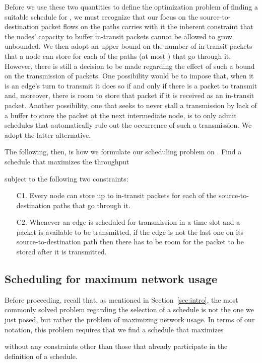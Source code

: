 \documentclass{article}
\begin{document}
Before we use these two quantities to define the optimization problem of finding
a suitable schedule for , we must recognize that our focus on the
source-to-destination packet flows on the paths
 carries with it the inherent
constraint that the nodes' capacity to buffer in-transit packets cannot be
allowed to grow unbounded. We then adopt an upper bound  on the number of
in-transit packets that a node can store for each of the paths (at most )
that go through it. However, there is still a decision to be made regarding the
effect of such a bound on the transmission of packets. One possibility would be
to impose that, when it is an edge's turn to transmit it does so if and only if
there is a packet to transmit and, moreover, there is room to store that packet
if it is received as an in-transit packet. Another possibility, one that seeks
to never stall a transmission by lack of a buffer to store the packet at the
next intermediate node, is to only admit schedules that automatically rule out
the occurrence of such a transmission. We adopt the latter alternative.

The following, then, is how we formulate our scheduling problem on . Find a
schedule  that maximizes the throughput

subject to the following two constraints:
\begin{itemize}
\item[C1.] Every node can store up to  in-transit packets for each of the
source-to-destination paths that go through it.
\item[C2.] Whenever an edge is scheduled for transmission in a time slot and a
packet is available to be transmitted, if the edge is not the last one on its
source-to-destination path then there has to be room for the packet to be stored
after it is transmitted.
\end{itemize}

\subsection{Scheduling for maximum network usage}

Before proceeding, recall that, as mentioned in Section~\ref{sec:intro}, the
most commonly solved problem regarding the selection of a schedule 
is not the one we just posed, but rather the problem of maximizing network
usage. In terms of our notation, this problem requires that we find a schedule
that maximizes

without any constraints other than those that already participate in the
definition of a schedule.
\end{document}
